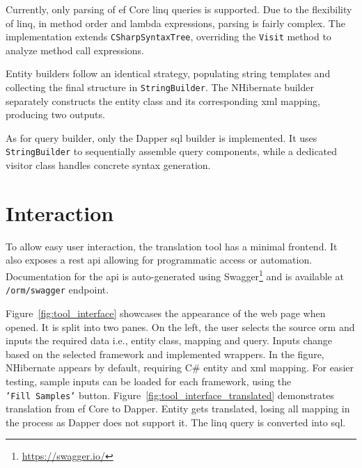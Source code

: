 Currently, only parsing of \acrshort{ef} Core \acrshort{linq} queries is supported. Due to the flexibility of \acrshort{linq}, in method order and lambda expressions, parsing is fairly complex. The implementation extends \texttt{CSharpSyntaxTree}, overriding the \texttt{Visit} method to analyze method call expressions. 

Entity builders follow an identical strategy, populating string templates and collecting the final structure in \texttt{StringBuilder}. The NHibernate builder separately constructs the entity class and its corresponding \acrshort{xml} mapping, producing two outputs.

As for query builder, only the Dapper \acrshort{sql} builder is implemented. It uses \texttt{StringBuilder} to sequentially assemble query components, while a dedicated visitor class handles concrete syntax generation.


\section{Interaction}
To allow easy user interaction, the translation tool has a minimal frontend. It also exposes a \acrshort{rest} \acrshort{api} allowing for programmatic access or automation. Documentation for the \acrshort{api} is auto-generated using Swagger\footnote{\url{https://swagger.io/}} and is available at \texttt{/orm/swagger} endpoint.

Figure~\ref{fig:tool_interface} showcases the appearance of the web page when opened. It is split into two panes. On the left, the user selects the source \acrshort{orm} and inputs the required data i.e., entity class, mapping and query. Inputs change based on the selected framework and implemented wrappers. In the figure, NHibernate appears by default, requiring C\# entity and \acrshort{xml} mapping. For easier testing, sample inputs can be loaded for each framework, using the \texttt{'Fill~Samples'} button. Figure~\ref{fig:tool_interface_translated} demonstrates translation from \acrshort{ef} Core to Dapper. Entity gets translated, losing all mapping in the process as Dapper does not support it. The \acrshort{linq} query is converted into \acrshort{sql}.

